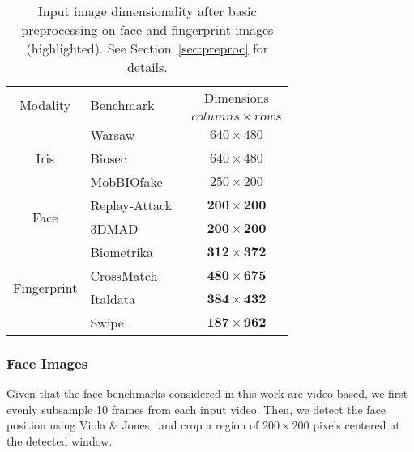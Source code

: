 \begin{table}[tb!]
\begin{center}
\caption{Input image dimensionality after basic preprocessing on face and fingerprint images (highlighted). See Section~\ref{sec:preproc} for details.}
\label{tab:databases:experiments}
\begin{tabular}{clc}
\hline
\multirow{2}{*}{Modality}
& \multirow{2}{*}{Benchmark}
                                             & Dimensions \\
&                                            & $columns \times rows$ \\
\hline
\hline
\multirow{3}{*}{Iris}
&Warsaw~\cite{Czajka:MMAR:2013}              & $640 \times  480$ \\
&Biosec~\cite{Ruiz-Albacete:BIOID:2008}      & $640 \times  480$ \\
&MobBIOfake~\cite{Sequeira:VISAPP:2014:base} & $250 \times  200$ \\
\hline
\multirow{2}{*}{Face}
& Replay-Attack~\cite{Chakka:IJCB:2011}      & $\mathbf{200 \times  200}$ \\
& 3DMAD~\cite{Chingovska:ICB:2013}           & $\mathbf{200 \times  200}$ \\
\hline
\multirow{4}{*}{Fingerprint} 
&Biometrika~\cite{Ghiani:ICB:2013}           & $\mathbf{312 \times  372}$ \\
&CrossMatch~\cite{Ghiani:ICB:2013}           & $\mathbf{480 \times  675}$ \\
&Italdata~\cite{Ghiani:ICB:2013}             & $\mathbf{384 \times  432}$ \\
&Swipe~\cite{Ghiani:ICB:2013}                & $\mathbf{187 \times  962}$ \\
\hline

\end{tabular}
\end{center}
\end{table}

\subsubsection{Face Images}

Given that the face benchmarks considered in this work are video-based, we first evenly subsample 10 frames from each input video. Then, we detect the face position using Viola \& Jones~\cite{Viola:IJCV:2001} and crop a region of $200 \times 200$ pixels centered at the detected window.

